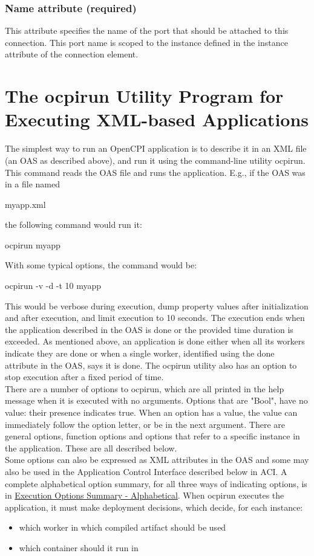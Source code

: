 \documentclass[10pt, a4paper, oneside]{article}
\renewcommand\_{\textunderscore\allowbreak} %
\begin{document}
\subsubsection{Name attribute (required)} This attribute specifies the name of the port that should be attached to this connection. This port name is scoped to the instance defined in the instance attribute of the connection element.
\section{The ocpirun Utility Program for Executing XML-based Applications} \label{sec:The ocpirun utility program for executing XML-based applications} The simplest way to run an OpenCPI application is to describe it in an XML file (an OAS as described above), and run it using the command-line utility ocpirun. This command reads the OAS file and runs the application.  E.g., if the OAS was in a file named \begin{ocpixml}
myapp.xml \end{ocpixml}
the following command would run it: \begin{ocpixml}
ocpirun myapp\end{ocpixml}

With some typical options, the command would be: \begin{ocpixml}
ocpirun -v -d -t 10 myapp\end{ocpixml} 

This would be verbose during execution, dump property values after initialization and after execution, and limit execution to 10 seconds. The execution ends when the application described in the OAS is done or the provided time duration is exceeded.  As mentioned above, an application is done either when all its workers indicate they are done or when a single worker, identified using the done attribute in the OAS, says it is done.  The ocpirun utility also has an option to stop execution after a fixed period of time.\\

There are a number of options to ocpirun, which are all printed in the help message when it is executed with no arguments.  Options that are "Bool", have no value:  their presence indicates true.  When an option has a value, the value can immediately follow the option letter, or be in the next argument.  There are general options, function options and options that refer to a specific instance in the application.  These are all described below.  \\
Some options can also be expressed as XML attributes in the OAS and some may also be used in the Application Control Interface described below in ACI. A complete alphabetical option summary, for all three ways of indicating options, is in \hyperlink{sec:Execution Options Summary - Alphabetical}{Execution Options Summary - Alphabetical}. When ocpirun executes the application, it must make deployment decisions, which decide, for each instance:
\begin{itemize}
\item which worker in which compiled artifact should be used
\item which container should it run in
\end{itemize}
\end{document}
